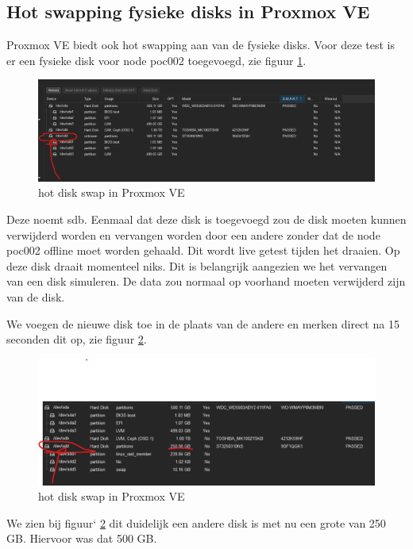 \subsection{Hot swapping fysieke disks in Proxmox VE}
Proxmox VE biedt ook hot swapping aan van de fysieke disks. 
Voor deze test is er een fysieke disk voor node poc002 toegevoegd, zie figuur \ref{fig:hotdisk-swap}.
\begin{figure}[H]
  \centering
  \includegraphics[width=1.2\textwidth]{../poc/hot-disk-prox.png}
  \caption{hot disk swap in Proxmox VE}
  \label{fig:hotdisk-swap}
\end{figure}
Deze noemt sdb. Eenmaal dat deze disk is toegevoegd zou de disk moeten kunnen verwijderd worden en vervangen worden door een andere zonder dat de node poc002 offline moet worden gehaald.
Dit wordt live getest tijden het draaien. Op deze disk draait momenteel niks. Dit is belangrijk aangezien we het vervangen van een disk simuleren. De data zou normaal op voorhand moeten verwijderd zijn van de disk.

We voegen de nieuwe disk toe in de plaats van de andere en merken direct na 15 seconden dit op, zie figuur \ref{fig:hotdiskvervangen-swap}.
\begin{figure}[H]
  \centering
  \includegraphics[width=1.2\textwidth]{../poc/hot-disktwee-prox.png}
  \caption{hot disk swap in Proxmox VE}
  \label{fig:hotdiskvervangen-swap}
\end{figure}

We zien bij figuur` \ref{fig:hotdiskvervangen-swap} dit duidelijk een andere disk is met nu een grote van 250 GB. Hiervoor was dat 500 GB.